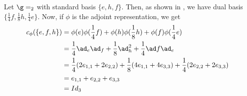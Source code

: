 \documentclass[11pt,leqno,oneside]{amsart}
\numberwithin{thm}{section}
\begin{document}
\begin{example}
  Let \(\g = \sl_2\) with standard basis \(\{e,h,f\}\). Then, as shown
  in \cite{nilp-las}, we have dual basis \(\{\frac{1}{4}f,\frac{1}{8}h,
  \frac{1}{4}e\}\). Now, if \(\phi\) is the adjoint representation, we get
  \begin{align*}
    c_\phi(\{e,f,h\})
    & = \phi(e)\phi(\frac{1}{4} f) + \phi(h)\phi(\frac{1}{8} h) +
      \phi(f)\phi(\frac{1}{4} e) \\
    & = \frac{1}{4} \ad_e \ad_f + \frac{1}{8} \ad_h^2 + \frac{1}{4}
      \ad f \ad_e \\
    & = \frac{1}{4}(2 e_{1,1} + 2 e_{2,2}) + \frac{1}{8}(4 e_{1,1} + 4
      e_{3,3}) + \frac{1}{4}(2e_{2,2} + 2e_{3,3}) \\
    & = e_{1,1} + e_{2,2} + e_{3,3} \\
    & = Id_3
  \end{align*}
\end{example}
\end{document}

